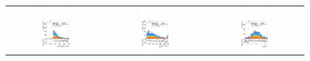\begin{figure}[htbp]
  \centering
  \setlength{\tabcolsep}{1.5pt}
  \renewcommand{\arraystretch}{0}

  \begin{tabular}{@{}c c c@{}}
    \includegraphics[width=0.33\textwidth]{images/plots_modelling_run2_run3_variables/run_2_tth/plot_tau_1_pt_hh_tth_15_16_17_18.pdf} &
    \includegraphics[width=0.33\textwidth]{images/plots_modelling_run2_run3_variables/run_2_tth/plot_SumPtBjet_hh_tth_15_16_17_18.pdf} &
    \includegraphics[width=0.33\textwidth]{images/plots_modelling_run2_run3_variables/run_2_tth/plot_tau_0_eta_hh_tth_15_16_17_18.pdf} \\[4pt]

\end{tabular}
\end{figure}
